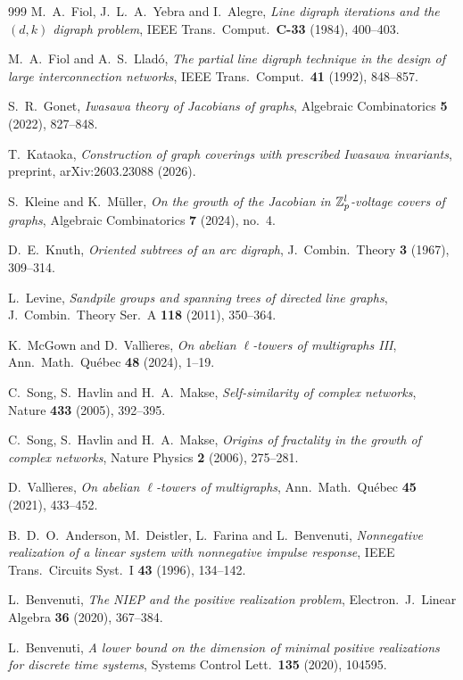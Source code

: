 \begin{thebibliography}{999}
 M.~A.~Fiol, J.~L.~A.~Yebra and I.~Alegre, \emph{Line digraph iterations and the $(d,k)$ digraph problem}, IEEE Trans.\ Comput.\ \textbf{C-33} (1984), 400--403.

 M.~A.~Fiol and A.~S.~Llad\'o, \emph{The partial line digraph technique in the design of large interconnection networks}, IEEE Trans.\ Comput.\ \textbf{41} (1992), 848--857.

 S.~R.~Gonet, \emph{Iwasawa theory of Jacobians of graphs}, Algebraic Combinatorics \textbf{5} (2022), 827--848.

 T.~Kataoka, \emph{Construction of graph coverings with prescribed Iwasawa invariants}, preprint, arXiv:2603.23088 (2026).

 S.~Kleine and K.~M\"uller, \emph{On the growth of the Jacobian in $\mathbb{Z}_p^{l}$-voltage covers of graphs}, Algebraic Combinatorics \textbf{7} (2024), no.~4.

 D.~E.~Knuth, \emph{Oriented subtrees of an arc digraph}, J.\ Combin.\ Theory \textbf{3} (1967), 309--314.

 L.~Levine, \emph{Sandpile groups and spanning trees of directed line graphs}, J.\ Combin.\ Theory Ser.~A \textbf{118} (2011), 350--364.

 K.~McGown and D.~Vall\`ieres, \emph{On abelian $\ell$-towers of multigraphs III}, Ann.\ Math.\ Qu\'ebec \textbf{48} (2024), 1--19.

 C.~Song, S.~Havlin and H.~A.~Makse, \emph{Self-similarity of complex networks}, Nature \textbf{433} (2005), 392--395.

 C.~Song, S.~Havlin and H.~A.~Makse, \emph{Origins of fractality in the growth of complex networks}, Nature Physics \textbf{2} (2006), 275--281.

 D.~Vall\`ieres, \emph{On abelian $\ell$-towers of multigraphs}, Ann.\ Math.\ Qu\'ebec \textbf{45} (2021), 433--452.

 B.~D.~O.~Anderson, M.~Deistler, L.~Farina and L.~Benvenuti, \emph{Nonnegative realization of a linear system with nonnegative impulse response}, IEEE Trans.\ Circuits Syst.\ I \textbf{43} (1996), 134--142.

 L.~Benvenuti, \emph{The NIEP and the positive realization problem}, Electron.\ J.\ Linear Algebra \textbf{36} (2020), 367--384.

 L.~Benvenuti, \emph{A lower bound on the dimension of minimal positive realizations for discrete time systems}, Systems Control Lett.\ \textbf{135} (2020), 104595.


\end{thebibliography}
